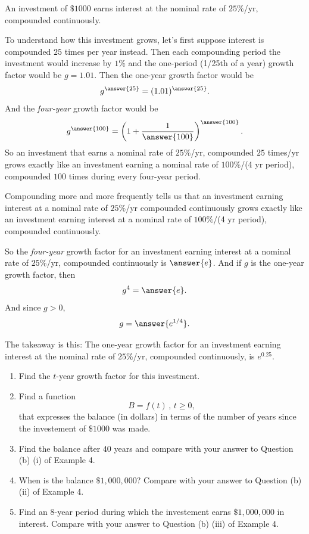 \documentclass{ximera}
\begin{document}
\begin{example}  \label{ExPfl3r8r3f31}
An investment of $\$1000$ earns interest at the nominal rate of $25\%$/yr, compounded continuously.

To understand how this investment grows, let's first suppose interest is compounded $25$ times per year instead. Then each compounding period the investment would increase by $1\%$ and the one-period (1/25th of a year) growth factor would be $g = 1.01$. Then the one-year growth factor would be 
\[
  g^{\answer{25}} = (1.01)^{\answer{25}}.
\]
And the \emph{four-year} growth factor would be
\[
    g^{\answer{100}} =   \left( 1 + \frac{1}{\answer{100}} \right)^{\answer{100}}. 
\]
So an investment that earns a nominal rate of $25\%$/yr, compounded $25$ times/yr grows exactly like an investment earning a nominal rate of $100\%$/(4 yr period), compounded $100$ times during every four-year period.

Compounding more and more frequently tells us that an investment earning interest at a nominal rate of $25\%$/yr compounded continuously grows exactly like an investment earning interest at a nominal rate of $100\%$/(4 yr period), compounded continuously. 

So the \emph{four-year} growth factor for an investment earning interest at a nominal rate of $25\%$/yr, compounded continuously is $\answer{e}$. And if $g$ is the one-year growth factor, then  
\[
       g^4 = \answer{e}.   
\]
And since $g>0$,
\[
        g = \answer{e^{1/4}} .
\]

The takeaway is this: The one-year growth factor for an investment earning interest at the nominal rate of $25\%$/yr, compounded continuously, is $e^{0.25}$.

\begin{enumerate}
\item Find the $t$-year growth factor for this investment.

\item Find a function 
\[
   B = f(t) \, , \, t\geq 0,
\]
that expresses the balance (in dollars) in terms of the number of years since the investement of $\$1000$ was made.

\item Find the balance after $40$ years and compare with your answer to Question (b) (i) of Example 4.

\item When is the balance $\$1,000,000$? Compare with your answer to Question (b) (ii) of Example 4.

\item Find an $8$-year period during which the investement earns $\$1,000,000$ in interest. Compare with your answer to Question (b) (iii) of Example 4.
\end{enumerate}

\end{example}
\end{document}
